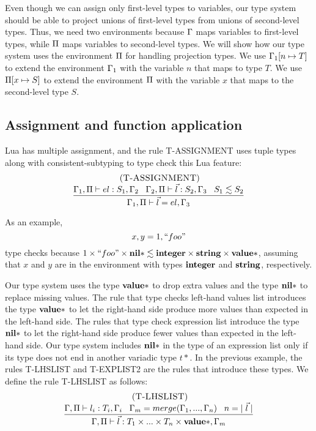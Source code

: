 Even though we can assign only first-level types to variables,
our type system should be able to project unions of first-level types
from unions of second-level types.
Thus, we need two environments because $\Gamma$ maps variables to first-level types,
while $\Pi$ maps variables to second-level types.
We will show how our type system uses the environment $\Pi$ for
handling projection types.
We use $\Gamma_{1}[n \mapsto T]$ to extend the environment $\Gamma_{1}$
with the variable $n$ that maps to type $T$.
We use $\Pi[x \mapsto S]$ to extend the environment $\Pi$ with
the variable $x$ that maps to the second-level type $S$.

\subsection{Assignment and function application}
\label{sec:assignment}

Lua has multiple assignment, and the rule \textsc{T-ASSIGNMENT} uses
tuple types along with consistent-subtyping to type check this Lua feature:
\[
\begin{array}{c}
\; (\textsc{T-ASSIGNMENT})\\
\begin{array}{c}
\dfrac{\Gamma_{1}, \Pi \vdash el:S_{1}, \Gamma_{2} \;\;\;
       \Gamma_{2}, \Pi \vdash \vec{l}:S_{2}, \Gamma_{3} \;\;\;
       S_{1} \lesssim S_{2}}
      {\Gamma_{1}, \Pi \vdash \vec{l} = el,\Gamma_{3}}
\end{array}
\end{array}
\]

As an example,
\[
x, y = 1, ``foo"
\]
type checks because
$1 \times ``foo" \times \mathbf{nil}{*} \lesssim \mathbf{integer} \times \mathbf{string} \times \mathbf{value}{*}$,
assuming that $x$ and $y$ are in the environment with
types $\mathbf{integer}$ and $\mathbf{string}$, respectively.

Our type system uses the type $\mathbf{value}{*}$ to drop extra values
and the type $\mathbf{nil}{*}$ to replace missing values.
The rule that type checks left-hand values list introduces the type
$\mathbf{value}{*}$ to let the right-hand side produce more values than
expected in the left-hand side.
The rules that type check expression list introduce the type
$\mathbf{nil}{*}$ to let the right-hand side produce fewer values than
expected in the left-hand side.
Our type system includes $\mathbf{nil}{*}$ in the type of an expression list only
if its type does not end in another variadic type $t{*}$.
In the previous example, the rules \textsc{T-LHSLIST} and \textsc{T-EXPLIST2}
are the rules that introduce these types.
We define the rule \textsc{T-LHSLIST} as follows:
\[
\begin{array}{c}
\; (\textsc{T-LHSLIST})\\
\dfrac{\Gamma, \Pi \vdash l_{i}:T_{i}, \Gamma_{i} \;\;\;
       \Gamma_{m} = merge(\Gamma_{1}, ..., \Gamma_{n}) \;\;\;
       n = |\;\vec{l}\;|}
      {\Gamma, \Pi \vdash \vec{l}:T_{1} \times ... \times T_{n} \times \mathbf{value}{*}, \Gamma_{m}}
\end{array}
\]

